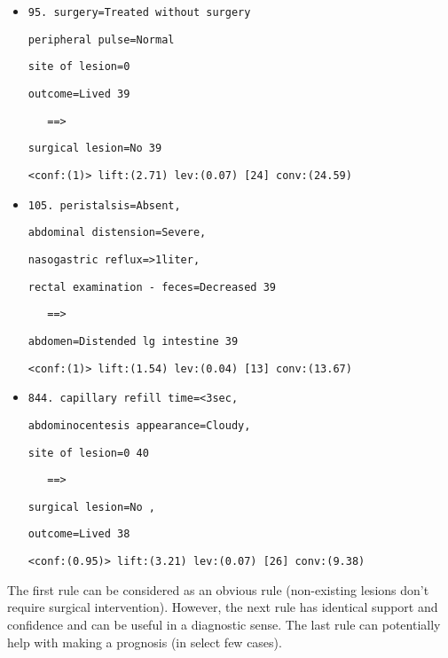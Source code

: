 \begin{itemize}

\item \verb|95. surgery=Treated without surgery |

\verb|peripheral pulse=Normal| 

\verb|site of lesion=0| 

\verb|outcome=Lived 39| 

\verb|   ==>|

\verb|surgical lesion=No 39|

\verb|<conf:(1)> lift:(2.71) lev:(0.07) [24] conv:(24.59)|


\item \verb|105. peristalsis=Absent,|

\verb|abdominal distension=Severe,|

\verb|nasogastric reflux=>1liter,|

\verb|rectal examination - feces=Decreased 39|

\verb|   ==>|

\verb|abdomen=Distended lg intestine 39|

\verb|<conf:(1)> lift:(1.54) lev:(0.04) [13] conv:(13.67)|


\item \verb|844. capillary refill time=<3sec,|

\verb|abdominocentesis appearance=Cloudy,|

\verb|site of lesion=0 40| 

\verb|   ==>|

\verb|surgical lesion=No ,|

\verb|outcome=Lived 38|

\verb|<conf:(0.95)> lift:(3.21) lev:(0.07) [26] conv:(9.38)|
\end{itemize}
%
The first rule can be considered as an obvious rule (non-existing lesions don't require surgical intervention).
However, the next rule has identical support and confidence and can be useful in a diagnostic sense.
The last rule can potentially help with making a prognosis (in select few cases).


